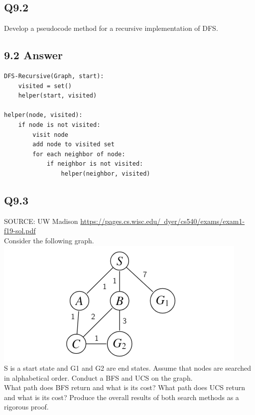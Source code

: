 \documentclass{article}
\begin{document}
\subsection*{Q9.2}
Develop a pseudocode method for a recursive implementation of DFS.
\newpage
\subsection*{9.2 Answer}
\begin{verbatim}
DFS-Recursive(Graph, start):
    visited = set()
    helper(start, visited)

helper(node, visited):
    if node is not visited:
        visit node
        add node to visited set
        for each neighbor of node:
            if neighbor is not visited:
                helper(neighbor, visited)
\end{verbatim}
\newpage

\subsection*{Q9.3}
SOURCE: UW Madison \href{https://pages.cs.wisc.edu/~dyer/cs540/exams/exam1-f19-sol.pdf}{https://pages.cs.wisc.edu/~dyer/cs540/exams/exam1-f19-sol.pdf}
\\ Consider the following graph.
\\ \includegraphics{UCS_question_graph.png}
\\ S is a start state and G1 and G2 are end states. Assume that nodes are searched in alphabetical order. Conduct a BFS and UCS on the graph.
\\ What path does BFS return and what is its cost? What path does UCS return and what is its cost? Produce the overall
results of both search methods as a rigorous proof.
\newpage
\end{document}
